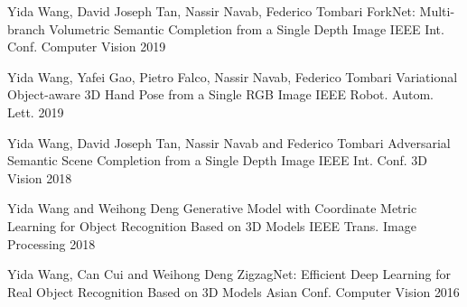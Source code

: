 


\begin{cventries}

\cventry
{Yida Wang, David Joseph Tan, Nassir Navab, Federico Tombari} %
{ForkNet: Multi-branch Volumetric Semantic Completion from a Single Depth Image} %
{IEEE Int. Conf. Computer Vision} %
{\href{https://www.youtube.com/watch?v=1WZ16bGff1o}{} 2019} %
{ %
}

\cventry
{Yida Wang, Yafei Gao, Pietro Falco, Nassir Navab, Federico Tombari} %
{Variational Object-aware 3D Hand Pose from a Single RGB Image} %
{IEEE Robot. Autom. Lett.} %
{\href{https://www.youtube.com/watch?v=tSTQ2NTqB4A}{} 2019} %
{ %
}

\cventry
{Yida Wang, David Joseph Tan, Nassir Navab and Federico Tombari} %
{Adversarial Semantic Scene Completion from a Single Depth Image} %
{IEEE Int. Conf. 3D Vision} %
{\href{https://www.youtube.com/watch?v=udvBhkupwXE&t=1s}{} 2018} %
{ %
}

\cventry
{Yida Wang and Weihong Deng} %
{Generative Model with Coordinate Metric Learning for Object Recognition Based on 3D Models} %
{IEEE Trans. Image Processing} %
{2018} %
{ %
}


\cventry
{Yida Wang, Can Cui and Weihong Deng} %
{ZigzagNet: Efficient Deep Learning for Real Object Recognition Based on 3D Models} %
{Asian Conf. Computer Vision} %
{2016} %
{ %
}



\end{cventries}
